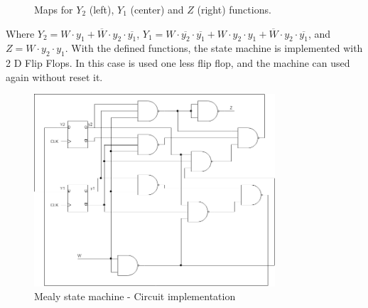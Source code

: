 \begin{figure}[H]
    \begin{center}
         \begin{Karnaughvuit}
         \end{Karnaughvuit}
         \begin{Karnaughvuit}
         \end{Karnaughvuit}
         \begin{Karnaughvuit}
         \end{Karnaughvuit}
         \caption{Maps for $Y_2$ (left), $Y_1$ (center) and $Z$ (right) functions.}
    \end{center}
    \end{figure}
Where $Y_2 = W \cdot y_1 + \overline{W} \cdot y_2 \cdot \overline{y_1}$, $Y_1 = W \cdot \overline{y_2} \cdot \overline{y_1} + W \cdot y_2 \cdot y_1 + \overline{W} \cdot y_2 \cdot \overline{y_1}$, 
and $Z = W \cdot y_2 \cdot y_1$.
With the defined functions, the state machine 
is implemented with 2 D Flip Flops. In this case
is used one less flip flop, and the machine can
used again without reset it.

\begin{figure}[H]
    \begin{centering}
    \includegraphics[width=0.8\textwidth]{Graficos2/2b_Compuertas_Mealy.png}
    \par\end{centering}
    \caption{Mealy state machine - Circuit implementation}
\end{figure}

